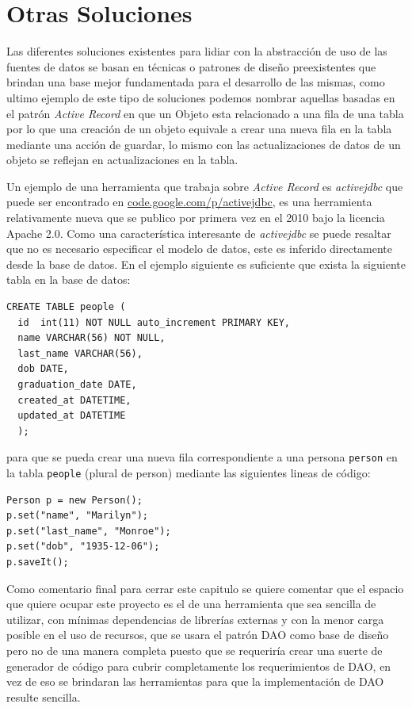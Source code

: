 \section{Otras Soluciones}
Las diferentes soluciones existentes para lidiar con la abstracción de uso de las fuentes de datos se basan en técnicas o patrones de diseño preexistentes que brindan una base mejor fundamentada para el desarrollo de las mismas, como ultimo ejemplo de este tipo de soluciones podemos nombrar aquellas basadas en el patrón \textit{Active Record} en que un Objeto esta relacionado a una fila de una tabla por lo que una creación de un objeto equivale a crear una nueva fila en la tabla mediante una acción de guardar, lo mismo con las actualizaciones de datos de un objeto se reflejan en actualizaciones en la tabla.

Un ejemplo de una herramienta que trabaja sobre \textit{Active Record} es \textit{activejdbc} que puede ser encontrado en \href{http://code.google.com/p/activejdbc/}{code.google.com/p/activejdbc}, es una herramienta relativamente nueva que se publico por primera vez en el 2010 bajo la licencia Apache 2.0. Como  una característica interesante de \textit{activejdbc} se puede resaltar que no es necesario especificar el modelo de datos, este es inferido directamente desde la base de datos. En el ejemplo siguiente es suficiente que exista la siguiente tabla en la base de datos:
%
\begin{lstlisting}[title=Ejemplo de uso de activejdbc: tabla que debe existir en la BD]
CREATE TABLE people (
  id  int(11) NOT NULL auto_increment PRIMARY KEY, 
  name VARCHAR(56) NOT NULL, 
  last_name VARCHAR(56), 
  dob DATE, 
  graduation_date DATE, 
  created_at DATETIME, 
  updated_at DATETIME
  );
\end{lstlisting}
%
para que se pueda crear una nueva fila correspondiente a una persona \verb=person= en la tabla \verb=people= (plural de person) mediante las siguientes lineas de código: 
\begin{lstlisting}[title=Ejemplo de uso de activejdbc: creando una nueva fila en una tabla]
Person p = new Person();
p.set("name", "Marilyn");
p.set("last_name", "Monroe");
p.set("dob", "1935-12-06");
p.saveIt(); 
\end{lstlisting}
%

Como comentario final para cerrar este capitulo se quiere comentar que el espacio que quiere ocupar este proyecto es el de una herramienta que sea sencilla de utilizar, con mínimas dependencias de librerías externas y con la menor carga posible en el uso de recursos, que se usara el patrón DAO como base de diseño pero no de una manera completa puesto que se requeriría crear una suerte de generador de código para cubrir completamente los requerimientos de DAO, en vez de eso se brindaran las herramientas para que la implementación de DAO resulte sencilla.